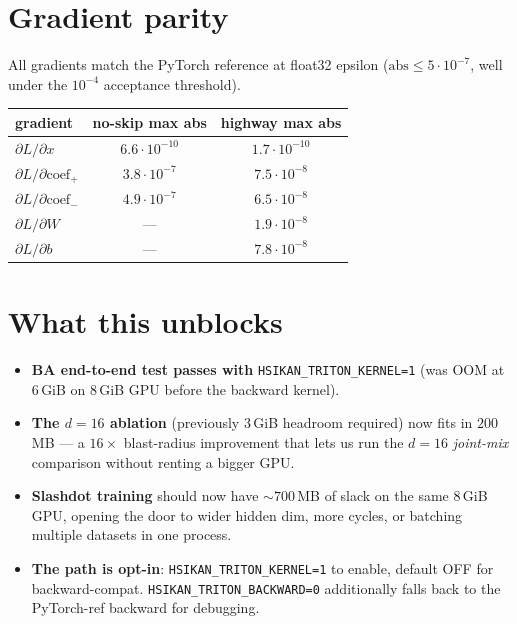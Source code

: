 \documentclass[11pt,a4paper]{article}
\begin{document}
\section{Gradient parity}

All gradients match the PyTorch reference at float32 epsilon
($\mathrm{abs} \le 5\!\cdot\!10^{-7}$, well under the
$10^{-4}$ acceptance threshold).

\begin{center}\small
\begin{tabular}{l c c}
\toprule
\textbf{gradient} & \textbf{no-skip max abs} & \textbf{highway max abs} \\
\midrule
$\partial L / \partial x$         & $6.6\!\cdot\!10^{-10}$ & $1.7\!\cdot\!10^{-10}$ \\
$\partial L / \partial \mathrm{coef}_{+}$ & $3.8\!\cdot\!10^{-7}$  & $7.5\!\cdot\!10^{-8}$  \\
$\partial L / \partial \mathrm{coef}_{-}$ & $4.9\!\cdot\!10^{-7}$  & $6.5\!\cdot\!10^{-8}$  \\
$\partial L / \partial W$         & ---                    & $1.9\!\cdot\!10^{-8}$  \\
$\partial L / \partial b$         & ---                    & $7.8\!\cdot\!10^{-8}$  \\
\bottomrule
\end{tabular}
\end{center}

\section{What this unblocks}

\begin{itemize}[leftmargin=*]
  \item \textbf{BA end-to-end test passes with} \texttt{HSIKAN\_TRITON\_KERNEL=1} (was OOM at $6\,$GiB on $8\,$GiB GPU before the backward kernel).
  \item \textbf{The $d=16$ ablation} (previously $3\,$GiB headroom required) now fits in $200\,$MB --- a $16\times$ blast-radius improvement that lets us run the $d=16$ \emph{joint-mix} comparison without renting a bigger GPU.
  \item \textbf{Slashdot training} should now have $\sim 700\,$MB of slack on the same $8\,$GiB GPU, opening the door to wider hidden dim, more cycles, or batching multiple datasets in one process.
  \item \textbf{The path is opt-in}: \texttt{HSIKAN\_TRITON\_KERNEL=1} to enable, default OFF for backward-compat. \texttt{HSIKAN\_TRITON\_BACKWARD=0} additionally falls back to the PyTorch-ref backward for debugging.
\end{itemize}
\end{document}

